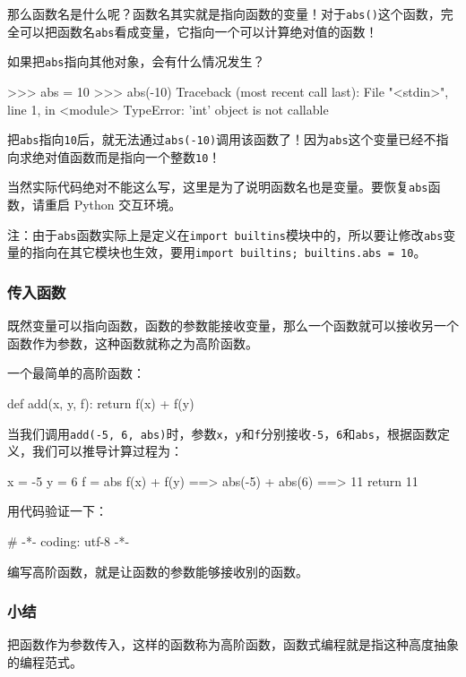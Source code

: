 那么函数名是什么呢？函数名其实就是指向函数的变量！对于\texttt{abs()}这个函数，完全可以把函数名\texttt{abs}看成变量，它指向一个可以计算绝对值的函数！

如果把\texttt{abs}指向其他对象，会有什么情况发生？

\begin{pythoncode}
>>> abs = 10
>>> abs(-10)
Traceback (most recent call last):
  File "<stdin>", line 1, in <module>
TypeError: 'int' object is not callable
\end{pythoncode}

把\texttt{abs}指向\texttt{10}后，就无法通过\texttt{abs(-10)}调用该函数了！因为\texttt{abs}这个变量已经不指向求绝对值函数而是指向一个整数\texttt{10}！

当然实际代码绝对不能这么写，这里是为了说明函数名也是变量。要恢复\texttt{abs}函数，请重启
Python 交互环境。

注：由于\texttt{abs}函数实际上是定义在\texttt{import\ builtins}模块中的，所以要让修改\texttt{abs}变量的指向在其它模块也生效，要用\texttt{import\ builtins;\ builtins.abs\ =\ 10}。

\hypertarget{ux4f20ux5165ux51fdux6570}{%
\subsubsection{传入函数}\label{ux4f20ux5165ux51fdux6570}}

既然变量可以指向函数，函数的参数能接收变量，那么一个函数就可以接收另一个函数作为参数，这种函数就称之为高阶函数。

一个最简单的高阶函数：

\begin{pythoncode}
def add(x, y, f):
    return f(x) + f(y)
\end{pythoncode}

当我们调用\texttt{add(-5,\ 6,\ abs)}时，参数\texttt{x}，\texttt{y}和\texttt{f}分别接收\texttt{-5}，\texttt{6}和\texttt{abs}，根据函数定义，我们可以推导计算过程为：

\begin{pythoncode}
x = -5
y = 6
f = abs
f(x) + f(y) ==> abs(-5) + abs(6) ==> 11
return 11
\end{pythoncode}

用代码验证一下：

\begin{pythoncode}
# -*- coding: utf-8 -*-
\end{pythoncode}

编写高阶函数，就是让函数的参数能够接收别的函数。

\hypertarget{ux5c0fux7ed3}{%
\subsubsection{小结}\label{ux5c0fux7ed3}}

把函数作为参数传入，这样的函数称为高阶函数，函数式编程就是指这种高度抽象的编程范式。

